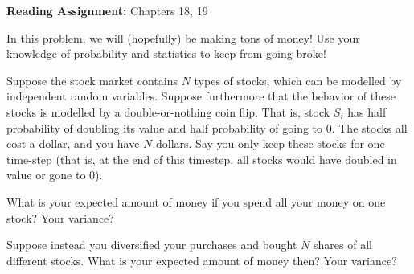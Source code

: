 \documentclass[12pt,twoside]{article}
\begin{document}
\noindent \textbf{Reading Assignment:}   Chapters 18, 19
\\

\begin{problem}{15}

In this problem, we will (hopefully) be making tons of money!  Use your knowledge of probability and statistics to keep from going broke!

		Suppose the stock market contains $N$ types of stocks, which can be modelled by independent random variables.  Suppose furthermore that the behavior of these stocks is modelled by a 
		double-or-nothing coin flip.  That is, stock $S_i$ has half probability of doubling its value and half probability of going to $0$.  The stocks all cost a dollar, and you have
		$N$ dollars.  Say you only keep these stocks for one time-step (that is, at the end of this timestep, all stocks would have doubled in value or gone to $0$). 

\bparts
		What is your expected amount of money if you spend all your money on one stock?  Your variance?
		
		Suppose instead you diversified your purchases and bought $N$ shares of all different stocks. What is your expected amount of money then?  Your variance?
		
\end{problem}
\end{document}
